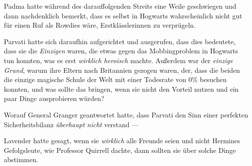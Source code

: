 Padma hatte während des darauffolgenden Streits eine Weile geschwiegen und dann nachdenklich bemerkt, dass es selbst in Hogwarts wahrscheinlich nicht gut für einen Ruf als Rowdies wäre, Erstklässlerinnen zu verprügeln.

Parvati hatte sich daraufhin aufgerichtet und ausgerufen, dass dies bedeutete, dass sie die \emph{Einzigen} waren, die etwas gegen das Mobbingproblem in Hogwarts tun konnten, was es erst \emph{wirklich heroisch} machte. Außerdem war der \emph{einzige} \emph{Grund}, warum ihre Eltern nach Britannien gezogen waren, der, dass die beiden die einzige magische Schule der Welt mit einer Todesrate von 0\% besuchen konnten, und was sollte das bringen, wenn sie nicht den Vorteil nutzen und ein paar Dinge ausprobieren würden?

Worauf General Granger geantwortet hatte, dass Parvati den Sinn einer perfekten Sicherheitsbilanz \emph{überhaupt nicht} verstand —

Lavender hatte gesagt, wenn sie \emph{wirklich} alle Freunde seien und nicht Hermines Gefolgsleute, wie Professor Quirrell dachte, dann sollten sie über solche Dinge abstimmen.

